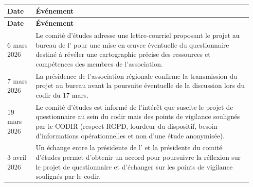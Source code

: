 \begingroup
\StyledTableSetup
\begin{xltabular}{\linewidth}{@{}p{2.6cm}Y@{}}
\toprule
\textbf{Date} & \textbf{Événement} \\
\midrule
\endfirsthead
\toprule
\textbf{Date} & \textbf{Événement} \\
\midrule
\endhead
\bottomrule
\endlastfoot

6 mars 2026 &
Le comité d'études adresse une lettre-courriel proposant le projet au bureau de l'\ARSeize{} pour une mise en œuvre éventuelle du questionnaire destiné à révéler une cartographie précise des ressources et compétences des membres de l'association\footnotemark[\noteLettreCODIRDecision]. \\
\addlinespace

7 mars 2026 &
La présidence de l'association régionale confirme la transmission du projet au bureau avant la poursuite éventuelle de la discussion lors du \acrshort{codir} du 17 mars. \\
\addlinespace

19 mars 2026 &
Le comité d'études est informé de l'intérêt que suscite le projet de questionnaire au sein du \acrshort{codir} mais des points de vigilance soulignés par le CODIR (respect RGPD, lourdeur du dispositif, besoin d'informations opérationnelles et non d'une étude anonymisée). \\
\addlinespace

3 avril 2026 &
Un échange entre la présidente de l'\ARSeize{} et la présidente du comité d'études permet d'obtenir un accord pour poursuivre la réflexion sur le projet de questionnaire et d'échanger sur les points de vigilance soulignés par le \acrshort{codir}. \\

\end{xltabular}
\endgroup
{}
\label{tab:decision_politique_questionnaire}

\endgroup
